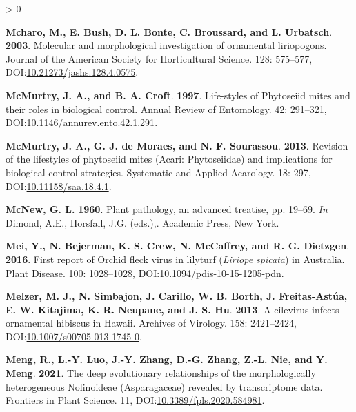 \documentclass{ufdissertation}[overrideChapters] %
\newlength{\cslhangindent}
\newenvironment{CSLReferences}[2] %
 {%
  \setlength{\parindent}{0pt}
  \ifodd #1 \everypar{\setlength{\hangindent}{\cslhangindent}}\ignorespaces\fi
  \ifnum #2 > 0
  \setlength{\parskip}{#2\baselineskip}
  \fi
 }%
 {}
\begin{document}
{\begin{CSLReferences}{1}{1}
\leavevmode{}%
\textbf{Mcharo, M., E. Bush, D. L. Bonte, C. Broussard, and L. Urbatsch}. \textbf{2003}. Molecular and morphological investigation of ornamental liriopogons. Journal of the American Society for Horticultural Science. 128: 575--577, DOI:\href{https://doi.org/10.21273/jashs.128.4.0575}{10.21273/jashs.128.4.0575}.

\leavevmode{}%
\textbf{McMurtry, J. A., and B. A. Croft}. \textbf{1997}. Life-styles of {Phytoseiid} mites and their roles in biological control. Annual Review of Entomology. 42: 291--321, DOI:\href{https://doi.org/10.1146/annurev.ento.42.1.291}{10.1146/annurev.ento.42.1.291}.

\leavevmode{}%
\textbf{McMurtry, J. A., G. J. de Moraes, and N. F. Sourassou}. \textbf{2013}. Revision of the lifestyles of phytoseiid mites ({Acari}: {Phytoseiidae}) and implications for biological control strategies. Systematic and Applied Acarology. 18: 297, DOI:\href{https://doi.org/10.11158/saa.18.4.1}{10.11158/saa.18.4.1}.

\leavevmode{}%
\textbf{McNew, G. L.} \textbf{1960}. Plant pathology, an advanced treatise, pp. 19--69. \emph{In} Dimond, A.E., Horsfall, J.G. (eds.),. Academic Press, New York.

\leavevmode{}%
\textbf{Mei, Y., N. Bejerman, K. S. Crew, N. McCaffrey, and R. G. Dietzgen}. \textbf{2016}. First report of {Orchid fleck virus} in lilyturf {(\emph{Liriope spicata})} in {Australia}. Plant Disease. 100: 1028--1028, DOI:\href{https://doi.org/10.1094/pdis-10-15-1205-pdn}{10.1094/pdis-10-15-1205-pdn}.

\leavevmode{}%
\textbf{Melzer, M. J., N. Simbajon, J. Carillo, W. B. Borth, J. Freitas-Astúa, E. W. Kitajima, K. R. Neupane, and J. S. Hu}. \textbf{2013}. A cilevirus infects ornamental hibiscus in {Hawaii}. Archives of Virology. 158: 2421--2424, DOI:\href{https://doi.org/10.1007/s00705-013-1745-0}{10.1007/s00705-013-1745-0}.

\leavevmode{}%
\textbf{Meng, R., L.-Y. Luo, J.-Y. Zhang, D.-G. Zhang, Z.-L. Nie, and Y. Meng}. \textbf{2021}. The deep evolutionary relationships of the morphologically heterogeneous {Nolinoideae} ({Asparagaceae}) revealed by transcriptome data. Frontiers in Plant Science. 11, DOI:\href{https://doi.org/10.3389/fpls.2020.584981}{10.3389/fpls.2020.584981}.


\end{CSLReferences}}
\end{document}
